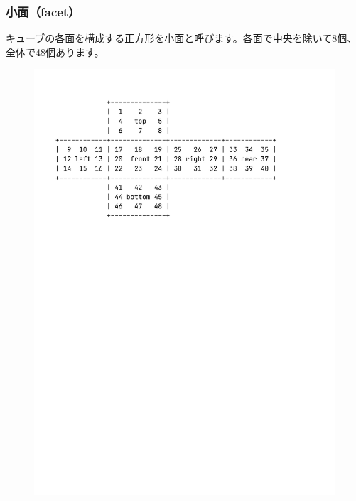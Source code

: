 \documentclass{beamer}
\begin{document}
\begin{frame}
    \frametitle{小面（facet）}

    キューブの各面を構成する正方形を小面と呼びます。各面で中央を除いて8個、全体で48個あります。

    \begin{figure}
        \includegraphics[scale=0.5]{images/display2d.pdf}
    \end{figure}
\end{frame}
\end{document}
